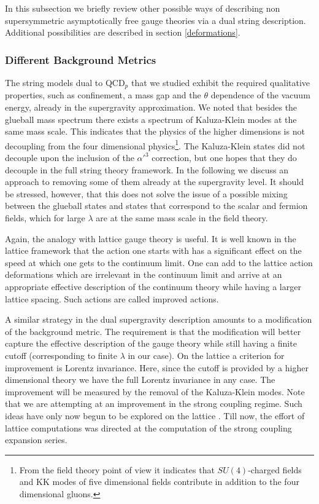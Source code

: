 In this subsection we briefly review other possible ways of describing
non supersymmetric asymptotically free gauge theories via a dual
string description. Additional possibilities are described in section
\ref{deformations}.

\subsubsection{Different Background Metrics}
\label{diffsuba}

The string models dual to QCD$_p$ that we studied exhibit the required
qualitative properties, such as confinement, a mass gap and the
$\theta$ dependence of the vacuum energy, already in the supergravity
approximation.  We noted that besides the glueball mass spectrum there
exists a spectrum of Kaluza-Klein modes at the same mass scale.  This
indicates that the  physics of the higher
dimensions is not decoupling from the four dimensional 
physics\footnote{From the field
theory point of view it indicates that $SU(4)$-charged fields and KK
modes of five dimensional fields contribute
in addition to the four dimensional gluons.}.
The 
Kaluza-Klein states did not decouple upon the inclusion of the
$\alpha'^3$ correction, but one hopes that they do decouple in the
full string theory framework.  In the following we discuss an approach
to removing some of them already at the supergravity level. It should
be stressed, however, that this does not solve the issue of a possible
mixing between the glueball states and states that
correspond to the scalar and fermion fields,
which for large
$\lambda$ are at the same mass scale in the field theory.

Again, the analogy with lattice gauge theory is useful.  It is well
known in the lattice framework that the action one starts with has a
significant effect on the speed at which one gets to the continuum
limit.  One can add to the lattice action deformations which are
irrelevant in the continuum limit and arrive at an appropriate
effective description of the continuum theory while having a larger
lattice spacing.  Such actions are called improved actions.

A similar strategy in the dual supergravity description amounts to a
modification of the background metric. The requirement is that the
modification will better capture the effective description of the
gauge theory while still having a finite cutoff (corresponding to
finite $\lambda$ in our case).  On the lattice a criterion for
improvement is Lorentz invariance.  Here, since the cutoff is provided
by a higher dimensional theory we have the full Lorentz invariance in
any case. The improvement will be measured by the removal of the
Kaluza-Klein modes.  Note that we are attempting at an improvement in
the strong coupling regime.  Such ideas have only now begun to be
explored on the lattice \cite{Dalley:1998gc}. Till now, the effort of
lattice computations was directed at the computation of the strong
coupling expansion series.

